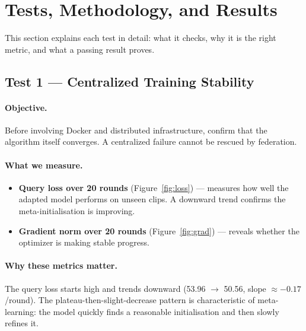 \documentclass[11pt,a4paper]{article}
\theoremstyle{definition}
\begin{document}
\section{Tests, Methodology, and Results}

\label{sec:tests}

This section explains each test in detail: what it checks, why it is the right
metric, and what a passing result proves.

\subsection{Test 1 — Centralized Training Stability}

\paragraph{Objective.}
Before involving Docker and distributed infrastructure, confirm that the algorithm
itself converges.  A centralized failure cannot be rescued by federation.

\paragraph{What we measure.}
\begin{itemize}[leftmargin=*]
  \item \textbf{Query loss over 20 rounds} (Figure~\ref{fig:loss}) --- measures
        how well the adapted model performs on unseen clips.  A downward trend
        confirms the meta-initialisation is improving.
  \item \textbf{Gradient norm over 20 rounds} (Figure~\ref{fig:grad}) --- reveals
        whether the optimizer is making stable progress.
\end{itemize}

\paragraph{Why these metrics matter.}
The query loss starts high and trends downward (53.96 $\to$ 50.56, slope
$\approx -0.17$/round).  The plateau-then-slight-decrease pattern is
characteristic of meta-learning: the model quickly finds a reasonable
initialisation and then slowly refines it.
\end{document}

